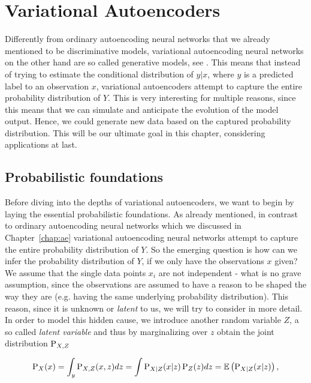 \chapter{Variational Autoencoders}\label{chap:vae}

Differently from ordinary autoencoding neural networks that we already mentioned to be discriminative models, variational autoencoding neural networks on the other hand are so called generative models, see \cite[Chapter~5]{cinelli2021variational}. This means that instead of trying to estimate the conditional distribution of $y|x$, where $y$ is a predicted label to an observation $x$, variational autoencoders attempt to capture the entire probability distribution of $Y$. This is very interesting for multiple reasons, since this means that we can simulate and anticipate the evolution of the model output. Hence, we could generate new data based on the captured probability distribution. This will be our ultimate goal in this chapter, considering applications at last.

\section{Probabilistic foundations}

Before diving into the depths of variational autoencoders, we want to begin by laying the essential probabilistic foundations. As already mentioned, in contrast to ordinary autoencoding neural networks which we discussed in Chapter~\ref{chap:ae}
variational autoencoding neural networks attempt to capture the entire probability distribution of $Y$. So the emerging question is how can we infer the probability distribution of $Y$, if we only have the observations $x$ given? We assume that the single data points $x_i$ are not independent - what is no grave assumption, since the observations are assumed to have a reason to be shaped the way they are (e.g. having the same underlying probability distribution). This reason, since it is unknown or \textit{latent} to us, we will try to consider in more detail. In order to model this hidden cause, we introduce another random variable $Z$, a so called \textit{latent variable} and thus by marginalizing over $z$ obtain the joint distribution $\operatorname{\text{P}}_{X, Z}$

\begin{align}\label{eq:evidence}
\operatorname{\text{P}}_X(x) = \int_y \operatorname{\text{P}}_{X,Z}(x,z) dz = \int \operatorname{\text{P}}_{X|Z}(x|z)\operatorname{\text{P}}_{Z}(z)dz = \operatorname{\mathbb{E}} \left( \operatorname{\text{P}}_{X|Z}(x|z) \right),
\end{align}


